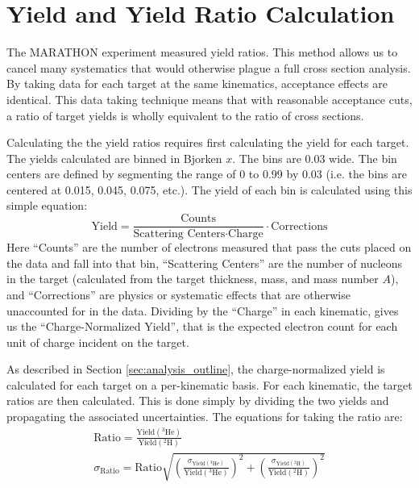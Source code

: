 \section{Yield and Yield Ratio Calculation}

The MARATHON experiment measured yield ratios. This method allows us to cancel many systematics that would otherwise plague a full cross section analysis. By taking data for each target at the same kinematics, acceptance effects are identical. This data taking technique means that with reasonable acceptance cuts, a ratio of target yields is wholly equivalent to the ratio of cross sections.

Calculating the the yield ratios requires first calculating the yield for each target. The yields calculated are binned in Bjorken $x$. The bins are 0.03 wide. The bin centers are defined by segmenting the range of 0 to 0.99 by 0.03 (i.e. the bins are centered at 0.015, 0.045, 0.075, etc.). The yield of each bin is calculated using this simple equation:
\begin{equation}
	\text{Yield} = \frac{\text{Counts}}{\text{Scattering Centers} \cdot \text{Charge}} \cdot \text{Corrections}
	\label{eqn:yield}
\end{equation}
Here ``Counts'' are the number of electrons measured that pass the cuts placed on the data and fall into that bin, ``Scattering Centers'' are the number of nucleons in the target (calculated from the target thickness, mass, and mass number $A$), and ``Corrections'' are physics or systematic effects that are otherwise unaccounted for in the data. Dividing by the ``Charge'' in each kinematic, gives us the ``Charge-Normalized Yield'', that is the expected electron count for each unit of charge incident on the target.

As described in Section \ref{sec:analysis_outline}, the charge-normalized yield is calculated for each target on a per-kinematic basis. For each kinematic, the target ratios are then calculated. This is done simply by dividing the two yields and propagating the associated uncertainties. The equations for taking the ratio are:
\begin{align}
	\text{Ratio} = \frac{\text{Yield}\left(^3\text{He}\right)}{\text{Yield}\left(^2\text{H}\right)} \\
	\sigma_{\text{Ratio}} = \text{Ratio}\sqrt{\left(\frac{\sigma_{\text{Yield}\left(^3\text{He}\right)}}{\text{Yield}\left(^3\text{He}\right)}\right)^2 + \left(\frac{\sigma_{\text{Yield}\left(^2\text{H}\right)}}{\text{Yield}\left(^2\text{H}\right)}\right)^2}
\end{align}

